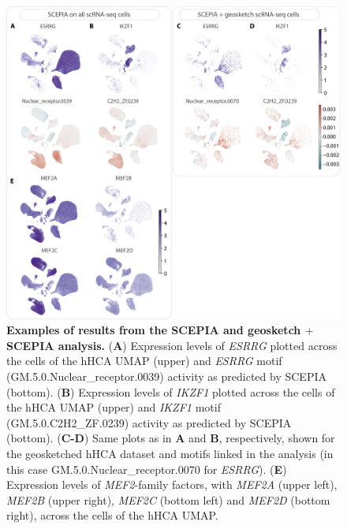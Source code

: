 \begin{figure}
    \centering
    \includegraphics[height=0.666\linewidth]{ch.scepia/imgs/SCEPIA_SCEPIAGEO_BiologicalExamples_Myriad_v4_SuppFigFeatures2.png}
    \caption{\textbf{Examples of results from the SCEPIA and geosketch $+$ SCEPIA analysis.} (\textbf{A}) Expression levels of \textit{ESRRG} plotted across the cells of the hHCA UMAP (upper) and \textit{ESRRG} motif (GM.5.0.Nuclear\_receptor.0039) activity as predicted by SCEPIA (bottom). (\textbf{B}) Expression levels of \textit{IKZF1} plotted across the cells of the hHCA UMAP (upper) and \textit{IKZF1} motif (GM.5.0.C2H2\_ZF.0239) activity as predicted by SCEPIA (bottom). (\textbf{C-D}) Same plots as in \textbf{A} and \textbf{B}, respectively, shown for the geosketched hHCA dataset and motifs linked in the analysis (in this case GM.5.0.Nuclear\_receptor.0070 for \textit{ESRRG}). (\textbf{E}) Expression levels of \textit{MEF2}-family factors, with \textit{MEF2A} (upper left), \textit{MEF2B} (upper right), \textit{MEF2C} (bottom left) and \textit{MEF2D} (bottom right), across the cells of the hHCA UMAP. }
    \label{fig:scepia_features2}
\end{figure}
